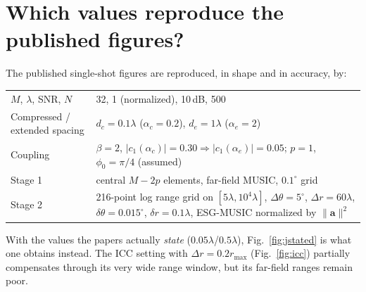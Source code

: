 \documentclass[11pt,a4paper]{article}
\newcommand{\dc}{d_c}\newcommand{\de}{d_e}
\begin{document}
\section{Which values reproduce the published figures?}
The published single-shot figures are reproduced, in shape and in accuracy, by:
\begin{center}\small
\begin{tabular}{@{}p{3.6cm}p{11.4cm}@{}}\toprule
$M$, $\lambda$, SNR, $N$ & 32, 1 (normalized), 10\,dB, 500\\
Compressed / extended spacing & $\dc=0.1\lambda$ ($\alpha_c=0.2$), $\de=1\lambda$ ($\alpha_e=2$)\\
Coupling & $\beta=2$, $|c_1(\alpha_c)|=0.30\Rightarrow|c_1(\alpha_e)|=0.05$; $p=1$, $\phi_0=\pi/4$ (assumed)\\
Stage 1 & central $M-2p$ elements, far-field MUSIC, $0.1^\circ$ grid\\
Stage 2 & 216-point log range grid on $[5\lambda,10^4\lambda]$, $\Delta\theta=5^\circ$, $\Delta r=60\lambda$,
 $\delta\theta=0.015^\circ$, $\delta r=0.1\lambda$, ESG-MUSIC normalized by $\|\mathbf a\|^2$\\\bottomrule
\end{tabular}\end{center}
With the values the papers actually \emph{state} ($0.05\lambda$/$0.5\lambda$), Fig.~\ref{fig:jstated} is what one obtains instead.
The ICC setting with $\Delta r=0.2r_{\max}$ (Fig.~\ref{fig:icc}) partially compensates through its very wide range window,
but its far-field ranges remain poor.

\end{document}
